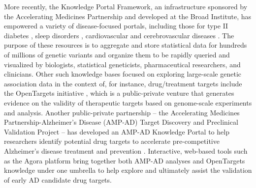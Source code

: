 \documentclass[letter]{bioinfo}
\begin{document}
More recently, the Knowledge Portal Framework, an infrastructure sponsored by the Accelerating Medicines Partnership and developed at the Broad Institute, has empowered a variety of disease-focused portals, including those for type II diabetes \citep{Broad:2018:Type}, sleep disorders \citep{Broad:2018:Sleep}, cardiovascular \citep{Broad:2018:Cardiovascular} and cerebrovascular diseases \citep{Broad:2018:Cerebrovascular}.  The purpose of these resources is to aggregate and store statistical data for hundreds of millions of genetic variants and organize them to be rapidly queried and visualized by biologists, statistical geneticists, pharmaceutical researchers, and clinicians.  Other such knowledge bases focused on exploring large-scale genetic association data in the context of, for instance, drug/treatment targets include the OpenTargets initiative \citep{Koscielny:2017:Open}, which is a public-private venture that generates evidence on the validity of therapeutic targets based on genome-scale experiments and analysis.  Another public-private partnership -- the Accelerating Medicines Partnership-Alzheimer's Disease (AMP-AD) Target Discovery and Preclinical Validation Project -- has developed an AMP-AD Knowledge Portal to help researchers identify potential drug targets to accelerate pre-competitive Alzheimer's disease treatment and prevention \citep{NIA:2015:AMP}.  Interactive, web-based tools such as the Agora platform \citep{Agora:2018} bring together both AMP-AD analyses and OpenTargets knowledge under one umbrella to help explore and ultimately assist the validation of early AD candidate drug targets.  
	
\end{document}
